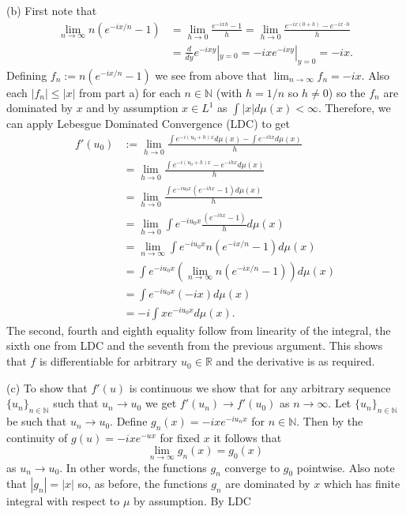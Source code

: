 \documentclass[12pt]{amsart} %
\def\N{\mathbb{N}}
\def\R{\mathbb{R}}
\begin{document}
\newpage
\noindent
(b) First note that 
\begin{align*}
	\lim_{n \to \infty} n \left( e^{-ix/n} - 1 \right)
	&= \lim_{h \to 0} \frac{ e^{-ixh} - 1  }{h} = \lim_{h \to 0}  \frac{ e^{-ix(0+h)} - e^{-ix\cdot 0}}{h} \\
	&= \frac{d}{dy} e^{-ixy}|_{y = 0} = -ix e^{-ixy}|_{y=0} = -ix.	
\end{align*}
Defining $f_n := n (e^{-ix/n} - 1)$ we see from above that $\lim_{n \to \infty} f_n = -ix.$ Also each $|f_n| \le |x|$ from part a) for each $n \in \N$ (with $h = 1/n$ so  $h \neq 0$) so the  $f_n$ are dominated by $x$ and by assumption  $x \in L^1$ as $\int |x|d\mu(x) < \infty.$ Therefore, we can apply Lebesgue Dominated Convergence (LDC) to get 
\begin{align*}
	f'(u_0) &:= \lim_{h \to 0} \frac{\int e^{-i(u_0+h)x}d\mu(x) - \int e^{-ihx}d\mu(x) }{h}\\
		&= \lim_{h \to 0} \frac{\int e^{-i(u_0+h)x} -  e^{-ihx}d\mu(x) }{h} \\
		&= \lim_{h \to 0} \frac{\int e^{-iu_0x}(e^{-ihx} - 1)d\mu(x) }{h} \\
		&= \lim_{h \to 0} \int  e^{-iu_0x} \frac{(e^{-ihx} - 1)}{h} d\mu(x) \\
		&= \lim_{n \to \infty} \int e^{-iu_0x} n(e^{-ix/n} - 1) d\mu(x) \\
		&=  \int e^{-iu_0x} \left(\lim_{n \to \infty}  n(e^{-ix/n} - 1)\right) d\mu(x) \\
		&=  \int e^{-iu_0x}(-ix) d\mu(x) \\
		&= -i \int xe^{-iu_0x} d\mu(x).
\end{align*}
The second, fourth and eighth equality follow from linearity of the integral, the sixth one from LDC and the seventh from the previous argument. This shows that $f$ is differentiable for arbitrary  $u_0 \in \R$ and the derivative is as required. 

\newpage
\noindent
 (c) To show that $f'(u)$ is continuous we show that for any arbitrary sequence $\{u_n\} _{n \in \N}$ such that $u_n \to u_0$ we get $f'(u_n) \to f'(u_0)$ as $n \to \infty.$ Let $\{u_n\}_{n \in \N}$ be such that $u_n \to u_0$. Define  $g_n(x) = -ixe^{-iu_nx}$ for $n \in \N$. Then by the continuity of $g(u) = -ixe^{-ux}$  for fixed $x$ it follows that  $$\lim_{n \to \infty} g_n(x) = g_0(x)$$ as $u_n \to u_0$. In other words, the functions $g_n$ converge to  $g_0$ pointwise. Also note that $|g_n| = |x|$ so, as before, the functions $g_n$  are dominated by $x$ which has finite integral with respect to  $\mu$ by assumption. By LDC
\end{document}
